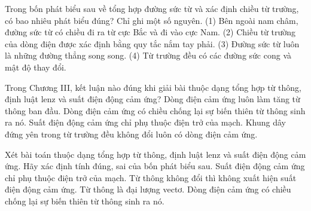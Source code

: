 \begin{ex}
Trong bốn phát biểu sau về tổng hợp đường sức từ và xác định chiều từ trường, có bao nhiêu phát biểu đúng? Chỉ ghi một số nguyên. (1) Bên ngoài nam châm, đường sức từ có chiều đi ra từ cực Bắc và đi vào cực Nam. (2) Chiều từ trường của dòng điện được xác định bằng quy tắc nắm tay phải. (3) Đường sức từ luôn là những đường thẳng song song. (4) Từ trường đều có các đường sức cong và mật độ thay đổi.
\end{ex}

\begin{ex}
Trong Chương III, kết luận nào đúng khi giải bài thuộc dạng tổng hợp từ thông, định luật lenz và suất điện động cảm ứng?
\choice
{Dòng điện cảm ứng luôn làm tăng từ thông ban đầu.}
{\True Dòng điện cảm ứng có chiều chống lại sự biến thiên từ thông sinh ra nó.}
{Suất điện động cảm ứng chỉ phụ thuộc điện trở của mạch.}
{Khung dây đứng yên trong từ trường đều không đổi luôn có dòng điện cảm ứng.}
\end{ex}

\begin{ex}
Xét bài toán thuộc dạng tổng hợp từ thông, định luật lenz và suất điện động cảm ứng. Hãy xác định tính đúng, sai của bốn phát biểu sau.
\choiceTF
{Suất điện động cảm ứng chỉ phụ thuộc điện trở của mạch.}
{\True Từ thông không đổi thì không xuất hiện suất điện động cảm ứng.}
{Từ thông là đại lượng vectơ.}
{\True Dòng điện cảm ứng có chiều chống lại sự biến thiên từ thông sinh ra nó.}
\end{ex}


